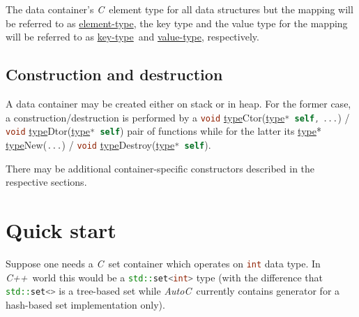 \documentclass[a4paper]{article}
\newcommand{\autoc}{\emph{AutoC}}
\newcommand{\C}{\emph{C}}
\newcommand{\Cpp}{\emph{C++}}
\newcommand{\type}{\underline{type}}
\newcommand{\etype}{\underline{element-type}}
\newcommand{\ktype}{\underline{key-type}}
\newcommand{\vtype}{\underline{value-type}}
\newcommand{\methx}[3]{\lstinline[language=C]{#1} \type{{#2}}(\type\lstinline[language=C]{* self,} \lstinline[language=C]{#3})}
\newcommand{\methz}[2]{\lstinline[language=C]{#1} \type{{#2}}(\type\lstinline[language=C]{* self})}
\newcommand{\newx}[1]{\type* \type{New}(\lstinline[language=C]{#1})}
\begin{document}
The data container's \C\ element type for all data structures but the mapping will be referred to as \etype, the key type and the value type for the mapping will be referred to as \ktype\ and \vtype, respectively.


\subsection{Construction and destruction}


A data container may be created either on stack or in heap. For the former case, a construction/destruction is performed by a \methx{void}{Ctor}{...} / \methz{void}{Dtor} pair of functions while for the latter its \newx{...} / \methz{void}{Destroy}.

There may be additional container-specific constructors described in the respective sections.


\section{Quick start}


Suppose one needs a \C\ set container which operates on \lstinline[language=C++]{int} data type.
In \Cpp\ world this would be a \lstinline[language=C++]{std::set<int>} type (with the difference that \lstinline[language=C++]{std::set<>} is a tree-based set while \autoc\ currently contains generator for a hash-based set implementation only).
\end{document}
